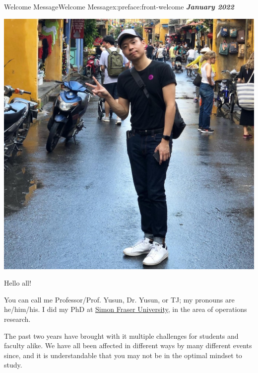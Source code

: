 \documentclass[oneside,10pt,]{book}
\newcommand{\alert}[1]{\textbf{\textit{#1}}}
\numberwithin{equation}{section}
\begin{document}
\par\medskip
{}
\null\clearpage
%
%
\typeout{************************************************}
\typeout{************************************************}
%
\begin{preface}{Welcome Message}{}{Welcome Message}{}{}{x:preface:front-welcome}
\alert{January 2022}%
\begin{sidebyside}{1}{0.15}{0.15}{0}%
\begin{sbspanel}{0.7}%
\includegraphics[width=\linewidth]{figs/TJ.jpg}
\end{sbspanel}%
\end{sidebyside}%
\par
Hello all!%
\par
You can call me Professor\slash{}Prof. Yusun, Dr. Yusun, or TJ; my pronouns are he\slash{}him\slash{}his. I did my PhD at \href{https://sfu.ca}{Simon Fraser University}, in the area of operations research.%
\par
The past two years have brought with it multiple challenges for students and faculty alike. We have all been affected in different ways by many different events since, and it is understandable that you may not be in the optimal mindset to study. %
\begin{sidebyside}{1}{0.15}{0.15}{0}%

\end{sidebyside}
\end{preface}
\end{document}
